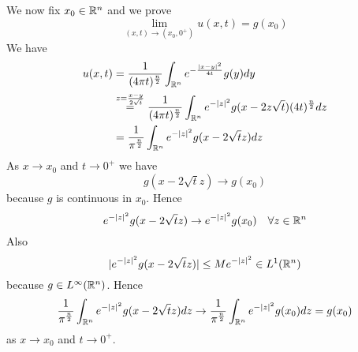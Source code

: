 We now fix $x_0 \in \mathbb{R}^n$ and we prove 
\begin{equation*}
        \lim_{(x,t) \rightarrow (x_0, 0^+)} u(x,t) = g(x_0)
\end{equation*}
We have
\begin{align*}
    u(x,t) &= \frac{1}{(4 \pi t)^\frac{n}{2}}\int_{\mathbb{R}^n} e^{-\frac{|x-y|^2}{4t}} g(y) dy \\
    & \stackrel{z = \frac{x-y}{2 \sqrt{t}}} = \frac{1}{(4 \pi t)^\frac{n}{2}} \int_{\mathbb{R}^n} e^{-|z|^2} g(x-2z\sqrt{t}) (4t)^\frac{n}{2}dz\\
    &= \frac{1}{\pi^\frac{n}{2}}\int_{\mathbb{R}^n} e^{-|z|^2} g(x-2\sqrt{t} z) dz 
\end{align*}
As $x \rightarrow x_0$ and $t \rightarrow 0^+$ we have 
\begin{equation*}
    g(x-2\sqrt{t}z) \rightarrow g(x_0)
\end{equation*}
because $g$ is continuous in $x_0$. Hence
\begin{equation*}
    e^{-|z|^2}g(x-2\sqrt{t}z) \rightarrow e^{-|z|^2} g(x_0) \quad \forall z \in \mathbb{R}^n
\end{equation*}
Also
\begin{equation*}
    |e^{-|z|^2}g(x-2\sqrt{t}z)| \leq M e^{-|z|^2} \in L^1(\mathbb{R}^n)
\end{equation*}
because $g \in L^\infty(\mathbb{R}^n)$. Hence
\begin{equation*}
    \frac{1}{\pi^\frac{n}{2}} \int_{\mathbb{R}^n} e^{-|z|^2}g(x-2\sqrt{t}z) dz\rightarrow \frac{1}{\pi^\frac{n}{2}} \int_{\mathbb{R}^n} e^{-|z|^2} g(x_0) dz = g(x_0)
\end{equation*}
as $x \rightarrow x_0$ and $t \rightarrow 0^+$. 
